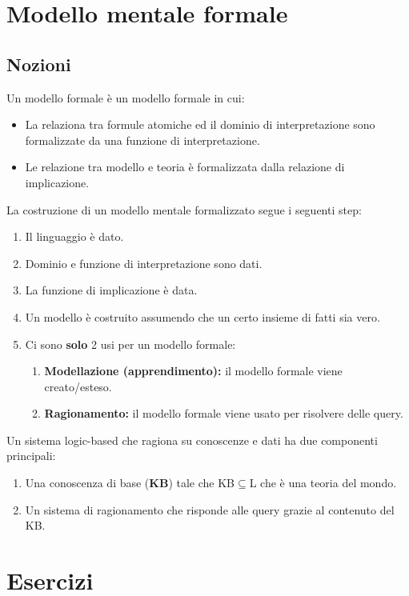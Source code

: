 \documentclass{book}
\begin{document}
    \section{Modello mentale formale}
    \subsection{Nozioni}
    Un modello formale è un modello formale in cui:
    \begin{itemize}
        \item La relaziona tra formule atomiche ed il dominio di interpretazione sono formalizzate da una funzione di interpretazione.
        \item Le relazione tra modello e teoria è formalizzata dalla relazione di implicazione.
    \end{itemize}
    La costruzione di un modello mentale formalizzato segue i seguenti step:
    \begin{enumerate}
        \item Il linguaggio è dato.
        \item Dominio e funzione di interpretazione sono dati.
        \item La funzione di implicazione è data.
        \item Un modello è costruito assumendo che un certo insieme di fatti sia vero.
        \item Ci sono \textbf{solo} 2 usi per un modello formale:
        \begin{enumerate}
            \item \textbf{Modellazione (apprendimento):} il modello formale viene creato/esteso.
            \item \textbf{Ragionamento:} il modello formale viene usato per risolvere delle query.
        \end{enumerate}
    \end{enumerate}
    Un sistema logic-based che ragiona su conoscenze e dati ha due componenti principali:
    \begin{enumerate}
        \item Una conoscenza di base (\textbf{KB}) tale che KB$\subseteq$L che è una teoria del mondo.
        \item Un sistema di ragionamento che risponde alle query grazie al contenuto del KB.
    \end{enumerate}

    \section{Esercizi}
\end{document}
